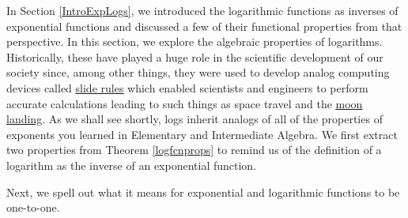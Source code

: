 In Section \ref{IntroExpLogs}, we introduced the logarithmic functions as inverses of exponential functions and discussed a few of their functional properties from that perspective.  In this section, we explore the algebraic properties of logarithms.  Historically, these have played a huge role in the scientific development of our society since, among other things, they were used to develop analog computing devices called \href{http://en.wikipedia.org/wiki/Slide_rule}{\underline{slide rules}} which enabled scientists and engineers to perform accurate calculations leading to such things as space travel and the \href{http://www.redorbit.com/news/space/73297/nasa_marks_35th_anniversary_of_first_moon_landing/}{\underline{moon landing}}.  As we shall see shortly, logs inherit analogs of all of the properties of exponents you learned in Elementary and Intermediate Algebra.  We first extract two properties from Theorem \ref{logfcnprops} to remind us of the definition of a logarithm as the inverse of an exponential function.
\smallskip


\smallskip

Next, we spell out what it means for exponential and logarithmic functions to be one-to-one.

\smallskip


